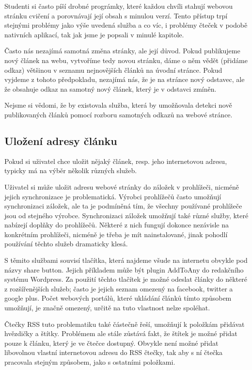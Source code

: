 Studenti si často píší drobné prográmky, které každou chvíli stahují webovou stránku cvičení a porovnávají její obsah s minulou verzí.
Tento přístup trpí stejnými problémy jako výše uvedená služba a co víc, i problémy čteček v podobě nativních aplikací, tak jak jsme je popsali v minulé kapitole. %

Často nás nezajímá samotná změna stránky, ale její důvod.
Pokud publikujeme nový článek na webu, vytvoříme tedy novou stránku, dáme o něm vědět (přidáme odkaz) většinou v seznamu nejnovějších článků na úvodní stránce.
Pokud vyjdeme z tohoto předpokladu, nezajímá nás, že je na stránce nový odstavec, ale že obsahuje odkaz na samotný nový článek, který je v odstavci zmíněn.

Nejsme si vědomi, že by existovala služba, která by umožňovala detekci nově publikovaných článků pomocí rozboru samotných odkazů na webové stránce.

\subsection{Uložení adresy článku}

Pokud si uživatel chce uložit nějaký článek, resp. jeho internetovou adresu, typicky má na výběr několik různých služeb.

Uživatel si může uložit adresu webové stránky do záložek v prohlížeči, nicméně jejich synchronizace je problematická.
Výrobci prohlížečů často umožňují synchronizaci záložek, ale ta je podmíněná tím, že všechny používané prohlížeče jsou od stejného výrobce.
Synchronizaci záložek umožňují také různé služby, které nabízejí doplňky do prohlížečů.
Některé z nich fungují dokonce nezávisle na konkrétním prohlížeči, nicméně je třeba je mít nainstalované, jinak pohodlí používání těchto služeb dramaticky klesá. %

S těmito službami souvisí tlačítka, která najdeme všude na internetu obvykle pod názvy share button.
Jejich příkladem může být plugin AddToAny do redakčního systému Wordpress. %
Za použití těchto tlačítek je možné odeslat články do některé z rozšířenějších služeb; často je jejich seznam omezený na facebook, twitter a google plus. %
Počet webových portálů, které ukládání článků tímto způsobem umožňují, je značně omezený, určitě na tuto vlastnost nelze spoléhat.

Čtečky RSS tuto problematiku také částečně řeší, umožňují k položkám přidávat hvězdičky a štítky.
Problémem ale stále zůstává fakt, že štítek je možné přidat pouze k článku, který je ve čtečce dostupný.
Obvykle není možné přidat libovolnou vlastní internetovou adresu do RSS čtečky, tak aby s ní čtečka pracovala stejným způsobem, jako s ostatními položkami.

